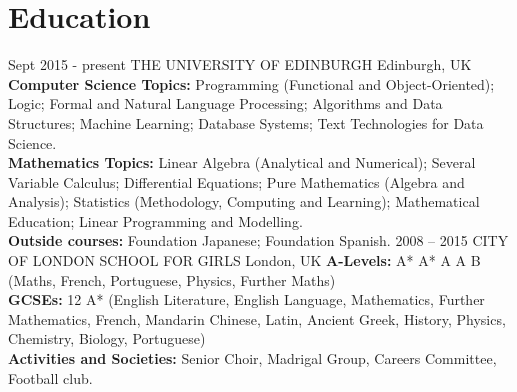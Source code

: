 \documentclass[]{cv-style}          %
\begin{document}
\section{Education}

\begin{entrylist}
\entry
  {Sept 2015 - present}
  {THE UNIVERSITY OF EDINBURGH}
  {Edinburgh, UK}
  {\\
  \textbf{Computer Science Topics:} Programming (Functional and Object-Oriented); Logic; Formal and Natural Language Processing; Algorithms and Data Structures; Machine Learning; Database Systems; Text Technologies for Data Science.\\
  \textbf{Mathematics Topics:} Linear Algebra (Analytical and Numerical); Several Variable Calculus; Differential Equations; Pure Mathematics (Algebra and Analysis); Statistics (Methodology, Computing and Learning); Mathematical Education; Linear Programming and Modelling. \\
  \textbf{Outside courses:} Foundation Japanese; Foundation Spanish.}
\entry
  {2008 -- 2015}
  {CITY OF LONDON SCHOOL FOR GIRLS}
  {London, UK}
  {\textbf{A-Levels:} A* A* A A B \\ (Maths, French, Portuguese, Physics, Further Maths) \\
  \textbf{GCSEs:} 12 \product A* (English Literature, English Language, Mathematics, Further Mathematics, French, Mandarin Chinese, Latin, Ancient Greek, History, Physics, Chemistry, Biology, Portuguese) \\
  \textbf{Activities and Societies:} Senior Choir, Madrigal Group, Careers Committee, Football club.
  }\\
\end{entrylist}



\end{document}
